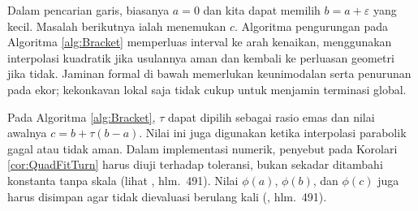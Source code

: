 \begin{remark} Dalam pencarian garis, biasanya $a=0$ dan kita dapat memilih $b=a+\varepsilon$ yang kecil. Masalah berikutnya ialah menemukan $c$. Algoritma pengurungan pada Algoritma \ref{alg:Bracket} memperluas interval ke arah kenaikan, menggunakan interpolasi kuadratik jika usulannya aman dan kembali ke perluasan geometri jika tidak. Jaminan formal di bawah memerlukan keunimodalan serta penurunan pada ekor; kekonkavan lokal saja tidak cukup untuk menjamin terminasi global.
\end{remark}

\begin{algorithm}
\caption{Algoritma Pengurungan dengan Usulan Parabolik Terlindungi}
\label{alg:Bracket}
\noindent{}
\end{algorithm}

\begin{remark} Pada Algoritma \ref{alg:Bracket}, $\tau$ dapat dipilih sebagai rasio emas dan nilai awalnya $c=b+\tau(b-a)$. Nilai ini juga digunakan ketika interpolasi parabolik gagal atau tidak aman. Dalam implementasi numerik, penyebut pada Korolari \ref{cor:QuadFitTurn} harus diuji terhadap toleransi, bukan sekadar ditambahi konstanta tanpa skala (lihat \cite{PTVF07}, hlm.~491). Nilai $\phi(a)$, $\phi(b)$, dan $\phi(c)$ juga harus disimpan agar tidak dievaluasi berulang kali (\cite{PTVF07}, hlm.~491).
\end{remark}

